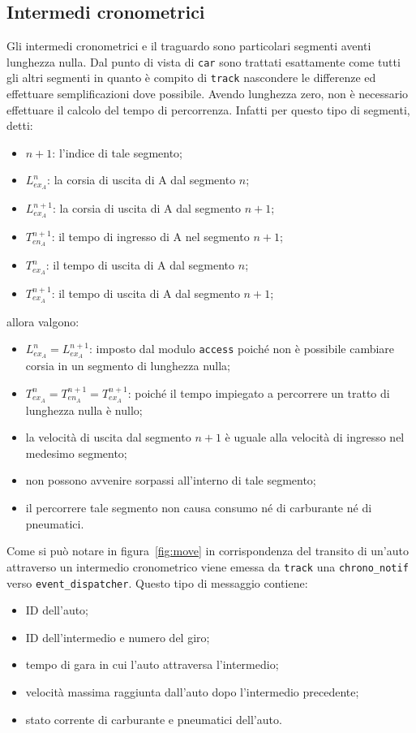 \subsection{Intermedi cronometrici}
Gli intermedi cronometrici e il traguardo sono particolari segmenti aventi lunghezza nulla. Dal punto di vista di \texttt{car} sono trattati esattamente come tutti gli altri segmenti in quanto è compito di \texttt{track} nascondere le differenze ed effettuare semplificazioni dove possibile. Avendo lunghezza zero, non è necessario effettuare il calcolo del tempo di percorrenza. Infatti per questo tipo di segmenti, detti:
\begin{itemize}
\item $n+1$: l'indice di tale segmento;
\item $L_{ex_A}^{n}$: la corsia di uscita di A dal segmento $n$;
\item $L_{ex_A}^{n+1}$: la corsia di uscita di A dal segmento $n+1$;
\item $T_{en_A}^{n+1}$: il tempo di ingresso di A nel segmento $n+1$;
\item $T_{ex_A}^{n}$: il tempo di uscita di A dal segmento $n$;
\item $T_{ex_A}^{n+1}$: il tempo di uscita di A dal segmento $n+1$;
\end{itemize}
allora valgono:
\begin{itemize}
\item $L_{ex_A}^{n} = L_{ex_A}^{n+1}$: imposto dal modulo \texttt{access} poiché non è possibile cambiare corsia in un segmento di lunghezza nulla;
\item $T_{ex_A}^{n} = T_{en_A}^{n+1} = T_{ex_A}^{n+1}$: poiché il tempo impiegato a percorrere un tratto di lunghezza nulla è nullo;
\item la velocità di uscita dal segmento $n+1$ è uguale alla velocità di ingresso nel medesimo segmento;
\item non possono avvenire sorpassi all'interno di tale segmento;
\item il percorrere tale segmento non causa consumo né di carburante né di pneumatici.
\end{itemize}
Come si può notare in figura~\ref{fig:move} in corrispondenza del transito di un'auto attraverso un intermedio cronometrico viene emessa da \texttt{track} una \texttt{chrono\_notif} verso \texttt{event\_dispatcher}. Questo tipo di messaggio contiene:
\begin{itemize}
\item ID dell'auto;
\item ID dell'intermedio e numero del giro;
\item tempo di gara in cui l'auto attraversa l'intermedio;
\item velocità massima raggiunta dall'auto dopo l'intermedio precedente;
\item stato corrente di carburante e pneumatici dell'auto.
\end{itemize}

